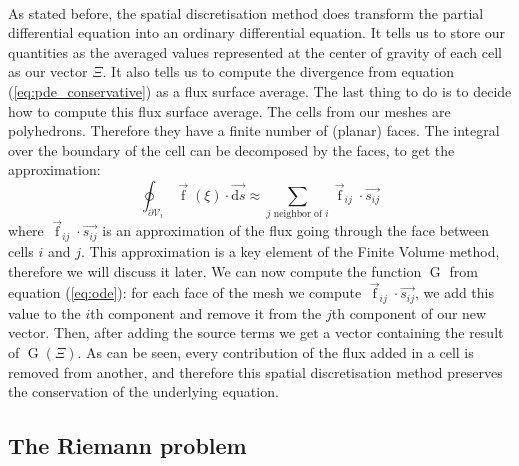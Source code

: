       \paragraph{}
      As stated before, the spatial discretisation method does transform the partial differential equation into an ordinary differential equation.
      It tells us to store our quantities as the averaged values represented at the center of gravity of each cell as our vector $\Xi$.
      It also tells us to compute the divergence from equation (\ref{eq:pde_conservative}) as a flux surface average.
      The last thing to do is to decide how to compute this flux surface average.
      The cells from our meshes are polyhedrons.
      Therefore they have a finite number of (planar) faces.
      The integral over the boundary of the cell can be decomposed by the faces, to get the approximation:
      \begin{equation}
        \oint_{\partial\mathcal{V}_i} \vec{\operatorname{f}}\left(\xi\right) \cdot \vec{\mathrm{d}s} \approx \sum_{j\textrm{ neighbor of } i} \vec{\operatorname{f}}_{ij} \cdot \vec{s_{ij}}
      \end{equation}
      where $\vec{\operatorname{f}}_{ij} \cdot \vec{s_{ij}}$ is an approximation of the flux going through the face between cells $i$ and $j$.
      This approximation is a key element of the Finite Volume method, therefore we will discuss it later.
      We can now compute the function $\operatorname{G}$ from equation (\ref{eq:ode}): for each face of the mesh we compute $\vec{\operatorname{f}}_{ij} \cdot \vec{s_{ij}}$, we add this value to the $i$th component and remove it from the $j$th component of our new vector.
      Then, after adding the source terms we get a vector containing the result of $\operatorname{G}\left(\Xi\right)$.
      As can be seen, every contribution of the flux added in a cell is removed from another, and therefore this spatial discretisation method preserves the conservation of the underlying equation.


    \subsection{The Riemann problem}

